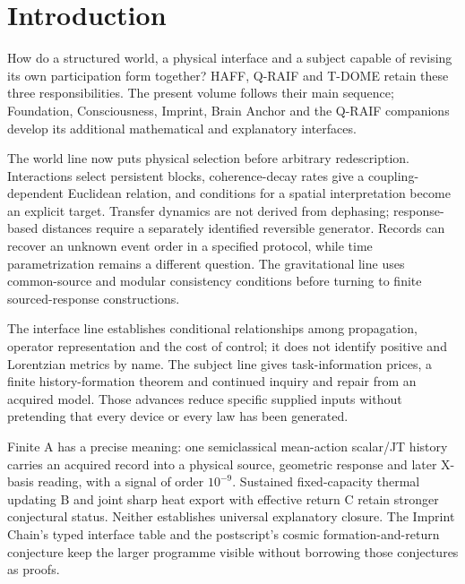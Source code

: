 \documentclass[11pt,a4paper]{article}
\begin{document}
\section*{Introduction}\label{collection:intro}
How do a structured world, a physical interface and a subject capable of revising its own participation form together? HAFF, Q-RAIF and T-DOME retain these three responsibilities. The present volume follows their main sequence; Foundation, Consciousness, Imprint, Brain Anchor and the Q-RAIF companions develop its additional mathematical and explanatory interfaces.

The world line now puts physical selection before arbitrary redescription. Interactions select persistent blocks, coherence-decay rates give a coupling-dependent Euclidean relation, and conditions for a spatial interpretation become an explicit target. Transfer dynamics are not derived from dephasing; response-based distances require a separately identified reversible generator. Records can recover an unknown event order in a specified protocol, while time parametrization remains a different question. The gravitational line uses common-source and modular consistency conditions before turning to finite sourced-response constructions.

The interface line establishes conditional relationships among propagation, operator representation and the cost of control; it does not identify positive and Lorentzian metrics by name. The subject line gives task-information prices, a finite history-formation theorem and continued inquiry and repair from an acquired model. Those advances reduce specific supplied inputs without pretending that every device or every law has been generated.

Finite A has a precise meaning: one semiclassical mean-action scalar/JT history carries an acquired record into a physical source, geometric response and later X-basis reading, with a signal of order $10^{-9}$. Sustained fixed-capacity thermal updating B and joint sharp heat export with effective return C retain stronger conjectural status. Neither establishes universal explanatory closure. The Imprint Chain's typed interface table and the postscript's cosmic formation-and-return conjecture keep the larger programme visible without borrowing those conjectures as proofs.
\end{document}
